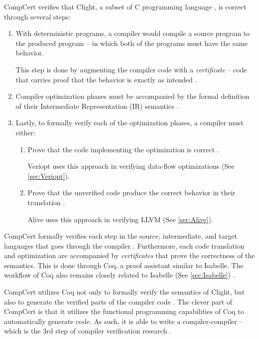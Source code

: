 CompCert verifies that Clight, a subset of C programming language \cite{compcertVerification}, is correct through several steps:
\begin{enumerate}
    \item 
    With deterministic programs, a compiler would compile a source program to the produced program -- in which both of the programs must have 
    the same behavior.
    
    This step is done by augmenting the compiler code with a \emph{certificate} -- code that carries proof that the behavior is exactly as intended 
    \cite[Sec. 2.2]{compcertVerification}.

    \item Compiler optimization phases must be accompanied by the formal definition of their Intermediate Representation (IR) semantics 
          \cite{compcertVerification,ATVA21_GraalVM_IR_Semantics}.
    
    \item Lastly, to formally verify each of the optimization phases, a compiler must either:
    \begin{enumerate}
        \item
        Prove that the code implementing the optimization is correct \cite[Sec. 2.4]{compcertVerification}.
        
        Veriopt uses this approach in verifying data-flow optimizations (See \ref{sec:Veriopt}).

        \item 
        Prove that the unverified code produce the correct behavior in their translation \cite[Sec. 2.4]{compcertVerification}.

        Alive uses this approach in verifying LLVM (See \ref{sec:Alive}).
    \end{enumerate}
\end{enumerate}

CompCert formally verifies each step in the source, intermediate, and target languages that goes through the compiler 
\cite[Sec. 3.3]{compcertVerification}. Furthermore, each code translation and optimization are accompanied by \emph{certificates} that prove 
the correctness of the semantics. This is done through Coq, a proof assistant similar to Isabelle. The workflow of Coq also remains closely related to 
Isabelle (See \ref{sec:Isabelle}) \cite[Sec. 3.3]{compcertVerification}. 

CompCert utilizes Coq not only to formally verify the semantics of Clight, but also to generate the verified parts of the compiler code 
\cite[Sec. 3.4]{compcertVerification}. The clever part of CompCert is that it utilizes the functional programming capabilities of Coq 
to automatically generate code. As such, it is able to write a compiler-compiler -- which is the 3rd step of compiler verification research 
\cite{CompilerOptimization}.

